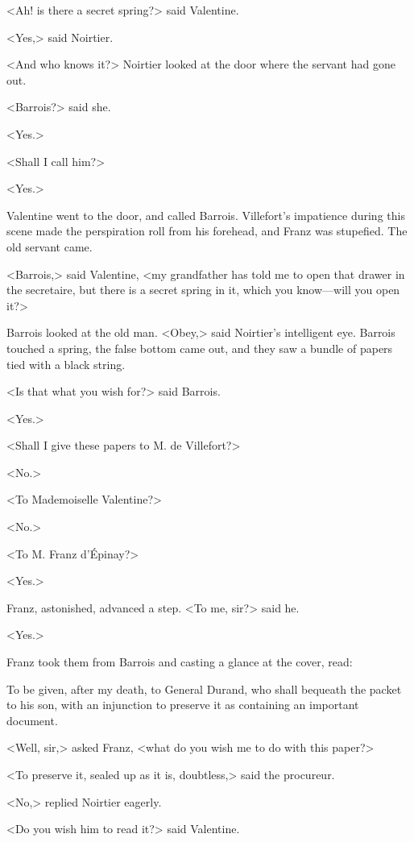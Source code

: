  <Ah! is there a secret spring?> said Valentine. 

 <Yes,> said Noirtier. 

 <And who knows it?> Noirtier looked at the door where the servant had gone out. 

 <Barrois?> said she. 

 <Yes.> 

 <Shall I call him?> 

 <Yes.> 

 Valentine went to the door, and called Barrois. Villefort's impatience during this scene made the perspiration roll from his forehead, and Franz was stupefied. The old servant came. 

 <Barrois,> said Valentine, <my grandfather has told me to open that drawer in the secretaire, but there is a secret spring in it, which you know—will you open it?> 

 Barrois looked at the old man. <Obey,> said Noirtier's intelligent eye. Barrois touched a spring, the false bottom came out, and they saw a bundle of papers tied with a black string. 

 <Is that what you wish for?> said Barrois. 

 <Yes.> 

 <Shall I give these papers to M. de Villefort?> 

 <No.> 

 <To Mademoiselle Valentine?> 

 <No.> 

 <To M. Franz d'Épinay?> 

 <Yes.> 

 Franz, astonished, advanced a step. <To me, sir?> said he. 

 <Yes.> 

 Franz took them from Barrois and casting a glance at the cover, read: 

\begin{mail}{}{To be given, after my death, to General Durand, who shall bequeath the packet to his son, with an injunction to preserve it as containing an important document.}
	
\end{mail} 

<Well, sir,> asked Franz, <what do you wish me to do with this paper?> 

 <To preserve it, sealed up as it is, doubtless,> said the procureur. 

 <No,> replied Noirtier eagerly. 

 <Do you wish him to read it?> said Valentine. 


